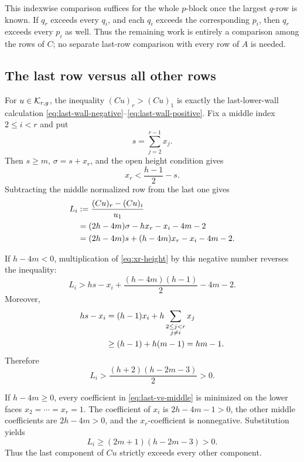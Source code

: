 \documentclass[11pt]{article}
\theoremstyle{remark}
\numberwithin{equation}{section}
\begin{document}
This indexwise comparison suffices for the whole \(p\)-block once the
largest \(q\)-row is known.  If \(q_r\) exceeds every \(q_i\), and each
\(q_i\) exceeds the corresponding \(p_i\), then \(q_r\) exceeds every
\(p_i\) as well.  Thus the remaining work is entirely a comparison among
the rows of \(C\); no separate last-row comparison with every row of \(A\)
is needed.

\subsection{The last row versus all other rows}

For \(u\in\mathcal{K}_{r,g}\), the inequality
\((Cu)_r>(Cu)_1\) is exactly the last-lower-wall calculation
\eqref{eq:last-wall-negative}--\eqref{eq:last-wall-positive}.  Fix a
middle index \(2\leq i<r\) and put
\[
s=\sum_{j=2}^{r-1}x_j.
\]
Then \(s\geq m\), \(\sigma=s+x_r\), and the open height condition gives
\begin{equation}\label{eq:xr-height}
x_r<\frac{h-1}{2}-s.
\end{equation}
Subtracting the middle normalized row from the last one gives
\begin{align}
L_i
&:=\frac{(Cu)_r-(Cu)_i}{u_1} \notag\\
&=(2h-4m)\sigma-hx_r-x_i-4m-2 \notag\\
&=(2h-4m)s+(h-4m)x_r-x_i-4m-2.
\label{eq:last-vs-middle}
\end{align}

If \(h-4m<0\), multiplication of \eqref{eq:xr-height} by this negative
number reverses the inequality:
\begin{equation}\label{eq:last-middle-neg-step}
L_i>hs-x_i+\frac{(h-4m)(h-1)}2-4m-2.
\end{equation}
Moreover,
\begin{align}
hs-x_i
&=(h-1)x_i+
h\sum_{\substack{2\leq j<r\\j\neq i}}x_j \notag\\
&\geq(h-1)+h(m-1)=hm-1.
\label{eq:hs-bound}
\end{align}
Therefore
\begin{equation}\label{eq:last-middle-negative}
L_i>\frac{(h+2)(h-2m-3)}2>0.
\end{equation}

If \(h-4m\geq0\), every coefficient in
\eqref{eq:last-vs-middle} is minimized on the lower faces
\(x_2=\cdots=x_r=1\).  The coefficient of \(x_i\) is
\(2h-4m-1>0\), the other middle coefficients are \(2h-4m>0\), and the
\(x_r\)-coefficient is nonnegative.  Substitution yields
\begin{equation}\label{eq:last-middle-positive}
L_i\geq(2m+1)(h-2m-3)>0.
\end{equation}
Thus the last component of \(Cu\) strictly exceeds every other component.
\end{document}
